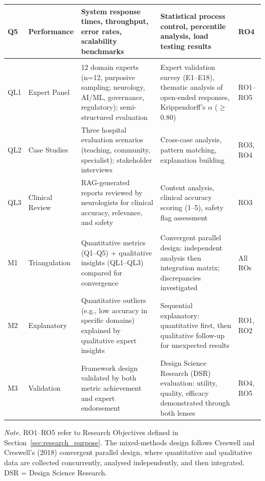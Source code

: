 {\begin{xltabular}{\textwidth}{@{} >{\raggedright\arraybackslash}p{0.6cm} >{\raggedright\arraybackslash}p{3.0cm} L L >{\raggedright\arraybackslash}p{1.5cm} @{}}
\addlinespace
Q5 & Performance & System response times, throughput, error rates, scalability benchmarks & Statistical process control, percentile analysis, load testing results & RO4 \\
\midrule
{} \\
\addlinespace
QL1 & Expert Panel & 12 domain experts (n=12, purposive sampling; neurology, AI/ML, governance, regulatory); semi-structured evaluation & Expert validation survey (E1--E18), thematic analysis of open-ended responses, Krippendorff's $\alpha$ ($\geq$0.80) & RO1--RO5 \\
\addlinespace
QL2 & Case Studies & Three hospital evaluation scenarios (teaching, community, specialist); stakeholder interviews & Cross-case analysis, pattern matching, explanation building & RO3, RO4 \\
\addlinespace
QL3 & Clinical Review & RAG-generated reports reviewed by neurologists for clinical accuracy, relevance, and safety & Content analysis, clinical accuracy scoring (1--5), safety flag assessment & RO3 \\
\midrule
{} \\
\addlinespace
M1 & Triangulation & Quantitative metrics (Q1--Q5) + qualitative insights (QL1--QL3) compared for convergence & Convergent parallel design: independent analysis then integration matrix; discrepancies investigated & All ROs \\
\addlinespace
M2 & Explanatory & Quantitative outliers (e.g., low accuracy in specific domains) explained by qualitative expert insights & Sequential explanatory: quantitative first, then qualitative follow-up for unexpected results & RO1, RO2 \\
\addlinespace
M3 & Validation & Framework design validated by both metric achievement and expert endorsement & Design Science Research (DSR) evaluation: utility, quality, efficacy demonstrated through both lenses & RO4, RO5 \\
\end{xltabular}}
\vspace{0.5em}
\noindent\textit{Note.} RO1--RO5 refer to Research Objectives defined in Section~\ref{sec:research_purpose}. The mixed-methods design follows Creswell and Creswell's (2018) convergent parallel design, where quantitative and qualitative data are collected concurrently, analysed independently, and then integrated. DSR = Design Science Research.
\fi %

